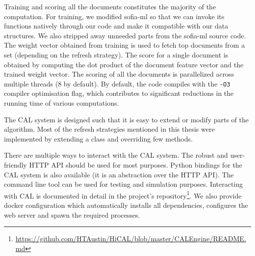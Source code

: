 Training and scoring all the documents constitutes the majority of the computation.
For training, we modified sofia-ml so that we can invoke its functions natively
through our code and make it compatible with our data structures. We also
stripped away unneeded parts from the sofia-ml source code. The weight vector
obtained from training is used to fetch top documents from a set (depending
on the refresh strategy). The score for a single document is obtained by
computing the dot product of the document feature vector and the trained
weight vector. The scoring of all the documents is parallelized across multiple
threads (8 by default). By default, the code compiles with the \texttt{-O3}
compiler optimisation flag, which contributes to significant reductions in the
running time of various computations.

The CAL system is designed such that it is easy to extend or modify parts of the
algorithm. Most of the refresh strategies mentioned in this thesis were
implemented by extending a class and overriding few methods.

There are multiple ways to interact with the CAL system. The robust and user-friendly
HTTP API should be used for most purposes. Python bindings for the CAL system is
also available (it is an abstraction over the HTTP API). The command line tool
can be used for testing and simulation purposes. Interacting with CAL is
documented in detail in the project's
repository\footnote{\url{https://github.com/HTAustin/HiCAL/blob/master/CALEngine/README.md}}.
We also provide docker configuration which automatically installs all
dependencies, configures the web server and spawn the required processes.
